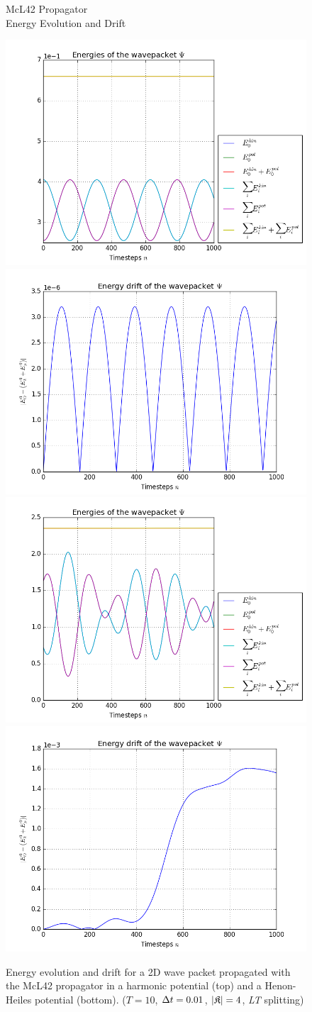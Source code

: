 \begin{figure}[ht]
	\centering
	\begin{minipage}[c]{\textwidth}
		\begin{center}
			\large McL42 Propagator \\[1mm]
			\normalsize Energy Evolution and Drift
			\vspace{4mm}
		\end{center}
	\end{minipage}
	\includegraphics[width=.45\textwidth]{figures/harmonic_energies_McL42.png}
	\includegraphics[width=.45\textwidth]{figures/harmonic_drift_McL42.png} \\
	\includegraphics[width=.45\textwidth]{figures/henon_energies_McL42.png}
	\includegraphics[width=.45\textwidth]{figures/henon_drift_McL42.png}
	\caption{Energy evolution and drift for a 2D wave packet propagated with the McL42 propagator in a harmonic potential (top) and a Henon-Heiles potential (bottom).
	($T = 10$, $\Delta t = 0.01$, $| \mathfrak{K} | = 4$, \emph{LT} splitting)}
	\label{fig:energy_McL42}
\end{figure}

